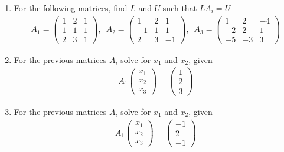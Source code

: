 {
\begin{enumerate}[label=\alph*)]
	\item For the following matrices, find $L$ and $U$ such that $LA_i=U$
	\begin{align*}
	A_1 = 
	\begin{pmatrix}
	1 & 2 & 1 \\
	1 & 1 & 1 \\
	2 & 3 & 1
	\end{pmatrix}, \,\,\,
	A_2 = 
	\begin{pmatrix}
	1 & 2 & 1 \\
	-1 & 1 & 1 \\
	2 & 3 & -1
	\end{pmatrix}, \,\,\,
	A_3 = 
	\begin{pmatrix}
	 1 &  2 & -4 \\
	-2 &  2 &  1 \\
	-5 & -3 &  3
	\end{pmatrix}
	\end{align*}
	
	\item For the previous matrices $A_i$ solve for $x_1$ and $x_2$, given
	\begin{align*}
	A_1
	\begin{pmatrix}
	x_1 \\
	x_2 \\
	x_3
	\end{pmatrix}
	=
	\begin{pmatrix}
	1 \\
	2 \\
	3
	\end{pmatrix}
	\end{align*}
	
	\item For the previous matrices $A_i$ solve for $x_1$ and $x_2$, given
	\begin{align*}
	A_1
	\begin{pmatrix}
	x_1 \\
	x_2 \\
	x_3
	\end{pmatrix}
	=
	\begin{pmatrix}
	-1 \\
	2 \\
	-1
	\end{pmatrix}
	\end{align*}
\end{enumerate}



}

